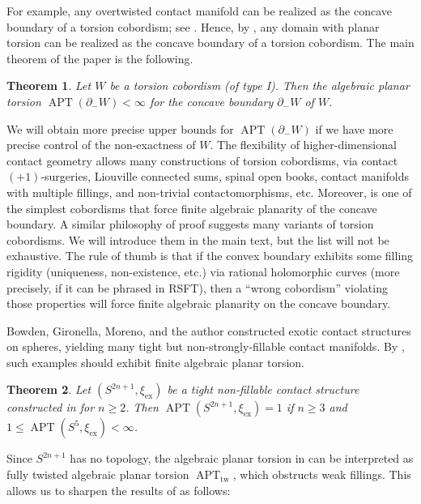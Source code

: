 \documentclass[11pt]{amsart}
\numberwithin{equation}{section}
\newtheorem{thmx}{Theorem}
\DeclareMathOperator{\APT}{APT}
\begin{document}
For example, any overtwisted contact manifold can be realized as the concave boundary of a torsion cobordism; see . Hence, by \cite{Wen13}, any domain with planar torsion can be realized as the concave boundary of a torsion cobordism. The main theorem of the paper is the following.

\begin{thmx}\label{thm:torsion}
   Let $W$ be a torsion cobordism (of type I). Then the algebraic planar torsion $\APT(\partial_-W)<\infty$ for the concave boundary $\partial_-W$ of $W$.
\end{thmx}

We will obtain more precise upper bounds for $\APT(\partial_-W)$ if we have more precise control of the non-exactness of $W$. The flexibility of higher-dimensional contact geometry allows many constructions of torsion cobordisms, via contact $(+1)$-surgeries, Liouville connected sums, spinal open books, contact manifolds with multiple fillings, and non-trivial contactomorphisms, etc. Moreover,  is one of the simplest cobordisms that force finite algebraic planarity of the concave boundary. A similar philosophy of proof suggests many variants of torsion cobordisms. We will introduce them in the main text, but the list will not be exhaustive. The rule of thumb is that if the convex boundary exhibits some filling rigidity (uniqueness, non-existence, etc.) via rational holomorphic curves (more precisely, if it can be phrased in RSFT), then a ``wrong cobordism'' violating those properties will force finite algebraic planarity on the concave boundary.

Bowden, Gironella, Moreno, and the author \cite{bowden2022tight} constructed exotic contact structures on spheres, yielding many tight but non-strongly-fillable contact manifolds. By , such examples should exhibit finite algebraic planar torsion.

\begin{thmx}\label{thm:sphere}
    Let $(S^{2n+1},\xi_{\mathrm{ex}})$ be a tight non-fillable contact structure constructed in \cite{bowden2022tight} for $n \ge  2$. Then $\APT(S^{2n+1},\xi_{\mathrm{ex}})=1$ if $n\ge 3$ and $1\le \APT(S^{5},\xi_{\mathrm{ex}})<\infty$.
\end{thmx}

Since $S^{2n+1}$ has no topology, the algebraic planar torsion in  can be interpreted as fully twisted algebraic planar torsion $\APT_{\mathrm{tw}}$, which obstructs weak fillings. This allows us to sharpen the results of \cite{bowden2022tight} as follows:
\end{document}
